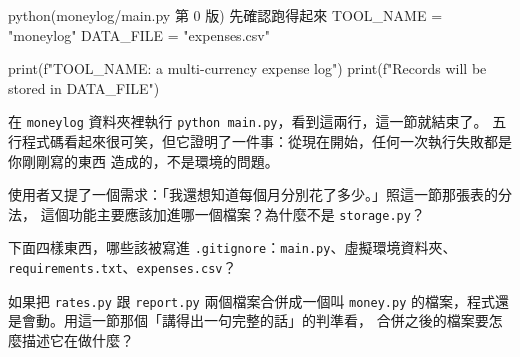\begin{example}{python}{(moneylog/main.py 第 0 版) 先確認跑得起來}
TOOL_NAME = "moneylog"
DATA_FILE = "expenses.csv"

print(f"{TOOL_NAME}: a multi-currency expense log")
print(f"Records will be stored in {DATA_FILE}")
\end{example}


在 \texttt{moneylog} 資料夾裡執行 \texttt{python main.py}，看到這兩行，這一節就結束了。
五行程式碼看起來很可笑，但它證明了一件事：從現在開始，任何一次執行失敗都是你剛剛寫的東西
造成的，不是環境的問題。



\begin{drills}[label=drills:capstone-spec]
\item 使用者又提了一個需求：「我還想知道每個月分別花了多少。」照這一節那張表的分法，
這個功能主要應該加進哪一個檔案？為什麼不是 \texttt{storage.py}？
\item 下面四樣東西，哪些該被寫進 \texttt{.gitignore}：\texttt{main.py}、虛擬環境資料夾、
\texttt{requirements.txt}、\texttt{expenses.csv}？
\item 如果把 \texttt{rates.py} 跟 \texttt{report.py} 兩個檔案合併成一個叫
\texttt{money.py} 的檔案，程式還是會動。用這一節那個「講得出一句完整的話」的判準看，
合併之後的檔案要怎麼描述它在做什麼？
\end{drills}

